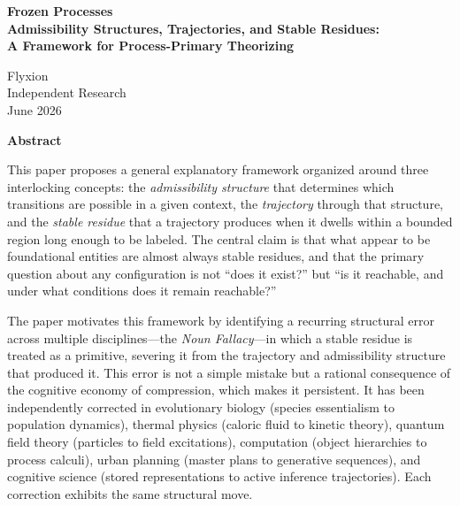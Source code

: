 \documentclass[12pt, a4paper]{article}
\theoremstyle{plain}
\theoremstyle{definition}
\theoremstyle{remark}
\begin{document}

\begin{titlepage}
\centering
\vspace*{2.5cm}
{\LARGE\bfseries Frozen Processes\\[0.6em]
\large Admissibility Structures, Trajectories, and Stable Residues:\\
A Framework for Process-Primary Theorizing\par}
\vspace{2.5cm}
{\large Flyxion}\\[0.5em]
{\normalsize Independent Research}\\[1em]
{\normalsize June 2026}
\end{titlepage}

\newpage
\thispagestyle{empty}
\begin{center}
{\large\bfseries Abstract}
\end{center}
\vspace{0.5em}
\noindent
This paper proposes a general explanatory framework organized around three
interlocking concepts: the \emph{admissibility structure} that determines
which transitions are possible in a given context, the \emph{trajectory}
through that structure, and the \emph{stable residue} that a trajectory
produces when it dwells within a bounded region long enough to be labeled.
The central claim is that what appear to be foundational entities are almost
always stable residues, and that the primary question about any configuration
is not ``does it exist?'' but ``is it reachable, and under what conditions
does it remain reachable?''

The paper motivates this framework by identifying a recurring structural error
across multiple disciplines---the \emph{Noun Fallacy}---in which a stable
residue is treated as a primitive, severing it from the trajectory and
admissibility structure that produced it. This error is not a simple mistake
but a rational consequence of the cognitive economy of compression, which
makes it persistent. It has been independently corrected in evolutionary
biology (species essentialism to population dynamics), thermal physics
(caloric fluid to kinetic theory), quantum field theory (particles to field
excitations), computation (object hierarchies to process calculi), urban
planning (master plans to generative sequences), and cognitive science
(stored representations to active inference trajectories). Each correction
exhibits the same structural move.
\end{document}
